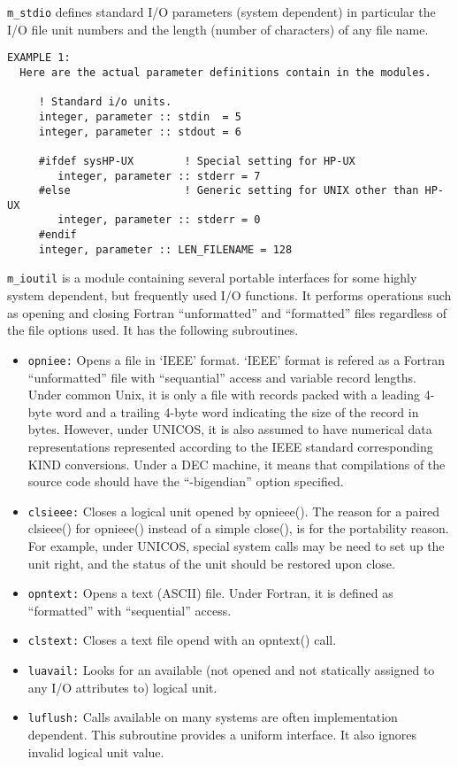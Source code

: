 \noindent
{\tt m\_stdio} defines standard I/O parameters (system dependent) in 
particular the I/O file unit numbers and the length (number of characters)
 of any file name.
%
\begin{verbatim}
EXAMPLE 1:
  Here are the actual parameter definitions contain in the modules.

     ! Standard i/o units.
     integer, parameter :: stdin  = 5
     integer, parameter :: stdout = 6

     #ifdef sysHP-UX        ! Special setting for HP-UX
        integer, parameter :: stderr = 7
     #else                  ! Generic setting for UNIX other than HP-UX
        integer, parameter :: stderr = 0
     #endif
     integer, parameter :: LEN_FILENAME = 128
\end{verbatim}
%
{\tt m\_ioutil} is a module containing several portable interfaces for
some highly system dependent, but frequently used I/O functions.
It performs operations such as opening and closing Fortran ``unformatted''
and ``formatted'' files regardless of the file options used.
It has the following subroutines.
%
\begin{itemize}
\item {\tt opniee:} Opens a file in `IEEE' format.
  	`IEEE' format is refered as a Fortran ``unformatted'' file with
  	``sequantial'' access and variable record lengths. Under common
  	Unix, it is only a file with records packed with a leading 4-byte
  	word and a trailing 4-byte word indicating the size of the record 
        in bytes. However, under UNICOS, it is also assumed to have 
        numerical data representations represented according to the IEEE 
        standard corresponding KIND conversions. Under a DEC machine, it 
        means that compilations of the source code should have the 
       ``-bigendian'' option specified.
\item {\tt clsieee:} Closes a logical unit opened by opnieee().
  	The reason for a paired clsieee() for opnieee() instead of a
  	simple close(), is for the portability reason. For example,
  	under UNICOS, special system calls may be need to set up the
  	unit right, and the status of the unit should be restored upon
  	close.
\item {\tt opntext:} Opens a text (ASCII) file. Under Fortran, it is 
      defined as ``formatted'' with ``sequential'' access.
\item {\tt clstext:} Closes a text file opend with an opntext() call.
\item {\tt luavail:} Looks for an available (not opened and not statically
      assigned to any I/O attributes to) logical unit.
\item {\tt luflush:} Calls available on many systems are often implementation
      dependent. This subroutine provides a uniform interface. It also 
      ignores invalid logical unit value. 
\end{itemize}

